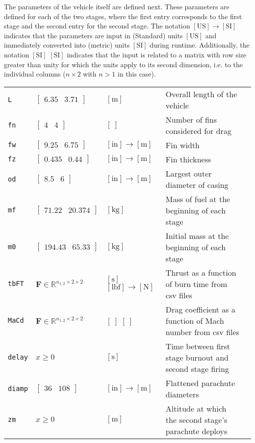 \documentclass[11pt]{thesis}
\numberwithin{equation}{section}
\begin{document}
The parameters of the vehicle itself are defined next. These parameters are defined for each of the two stages, where the first entry corresponds to the first stage and the second entry for the second stage. The notation $[\mathrm{US}] \rightarrow [\mathrm{SI}]$ indicates that the parameters are input in (Standard) units $[\mathrm{US}]$ and immediately converted into (metric) units $[\mathrm{SI}]$ during runtime. Additionally, the notation $[\mathrm{SI}]$ $[\mathrm{SI}]$ indicates that the input is related to a matrix with row size greater than unity for which the units apply to its second dimension, i.e. to the individual columns ($n \times 2$ with $n > 1$ in this case).
\begin{longtable}[l]{l l l l l}
\texttt{L} & $\begin{bmatrix}6.35 & 3.71\end{bmatrix}$ & $[\si{\m}]$ & Overall length of the vehicle \\
\texttt{fn} & $\begin{bmatrix}4 & 4\end{bmatrix}$ & $[\ ]$ & Number of fins considered for drag \\
\texttt{fw} & $\begin{bmatrix}9.25 & 6.75\end{bmatrix}$ & $[\mathrm{in}] \rightarrow [\si{\m}]$ & Fin width \\
\texttt{fz} & $\begin{bmatrix}0.435 & 0.44\end{bmatrix}$ & $[\mathrm{in}] \rightarrow [\si{\m}]$ & Fin thickness \\
\texttt{od} & $\begin{bmatrix}8.5 & 6\end{bmatrix}$ & $[\mathrm{in}] \rightarrow [\si{\m}]$ & Largest outer diameter of casing \\
\texttt{mf} & $\begin{bmatrix}71.22 & 20.374\end{bmatrix}$ & $[\si{\kg}]$ & Mass of fuel at the beginning of each stage \\
\texttt{m0} & $\begin{bmatrix}194.43 & 65.33\end{bmatrix}$ & $[\si{\kg}]$ & Initial mass at the beginning of each stage \\
\texttt{tbFT} & $\mathbf{F} \in \mathbb{R}^{n_{1,2} \times 2 \times 2}$ & $[\si{\s}]$ $[\mathrm{lbf}] \rightarrow [\si{\N}]$ & Thrust as a function of burn time from csv files \\
\texttt{MaCd} & $\mathbf{F} \in \mathbb{R}^{n_{1,2} \times 2 \times 2}$ & $[\ ]$ $[\ ]$ & Drag coefficient as a function of Mach number from csv files \\
\texttt{delay} & $x \geq 0$ & $[\si{\s}]$ & Time between first stage burnout and second stage firing \\
\texttt{diamp} & $\begin{bmatrix}36 & 108\end{bmatrix}$ & $[\mathrm{in}] \rightarrow [\si{\m}]$ & Flattened parachute diameters \\
\texttt{zm} & $x \geq 0$ & $[\si{\m}]$ & Altitude at which the second stage's parachute deploys
\end{longtable}
\end{document}
